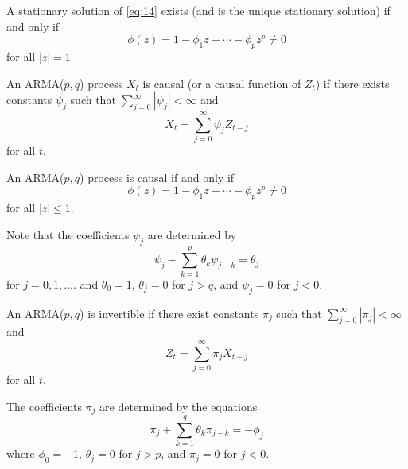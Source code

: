 \begin{thm}
  \label{defn:arma_processes:2}
  A stationary solution of \eqref{eq:14} exists (and is the unique
  stationary solution) if and only if
  \begin{equation}
    \label{eq:20}
    \phi(z) = 1 - \phi_{1} z - \cdots - \phi_{p} z^{p} \neq 0
  \end{equation} for all $|z| = 1$
\end{thm}

\begin{defn}
  \label{defn:arma_processes:3}
  An ARMA($p, q$) process $X_{t}$ is causal (or a causal function of
  $Z_{t}$) if there exists constants $\psi_{j}$ such that
  $\sum_{j=0}^{\infty} |\psi_{j}| < \infty$ and
  \begin{equation}
    \label{eq:21}
    X_{t} = \sum_{j=0}^{\infty} \psi_{j} Z_{t-j}
  \end{equation} for all $t$.
\end{defn}

\begin{thm}
  \label{defn:arma_processes:4}
  An ARMA($p, q$) process is causal if and only if
  \begin{equation}
    \label{eq:22}
    \phi(z) = 1 - \phi_{1} z - \cdots - \phi_{p} z^{p} \neq 0
  \end{equation} for all $|z| \leq 1$.

  Note that the coefficients $\psi_{j}$ are determined by
  \begin{equation}
    \label{eq:25}
    \psi_{j} - \sum_{k=1}^{p} \theta_{k} \psi_{j-k} = \theta_{j}
  \end{equation} for $j = 0, 1, \dots$.
  and $\theta_{0} = 1$, $\theta_{j} = 0$ for $j > q$, and $\psi_{j} =
  0$ for $j < 0$.
\end{thm}

\begin{defn}
  \label{defn:arma_processes:5}
  An ARMA($p, q$) is invertible if there exist constants $\pi_{j}$
  such that $\sum_{j=0}^{\infty} |\pi_{j}| < \infty$ and
  \begin{equation}
    \label{eq:23}
    Z_{t} = \sum_{j=0}^{\infty} \pi_{j} X_{t-j}
  \end{equation} for all $t$.

  The coefficients $\pi_{j}$ are determined by the equations
  \begin{equation}
    \label{eq:26}
    \pi_{j} + \sum_{k=1}^{q} \theta_{k} \pi_{j-k} = -\phi_{j}
  \end{equation}
  where $\phi_{0} = -1$, $\theta_{j} = 0$ for $j > p$, and $\pi_{j} =
  0$ for $j < 0$.
\end{defn}


